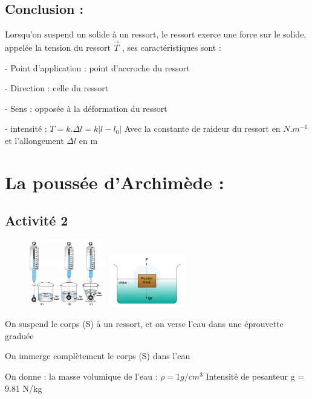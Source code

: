 \documentclass[12pt]{article}
\begin{document}
\subsection{Conclusion : }
Lorsqu’on suspend un solide à un ressort, le ressort exerce une force sur le solide, appelée la tension du ressort $\vec{T}$ ,
ses caractéristiques sont :

  - Point d’application : point d’accroche du ressort

  - Direction : celle du ressort

  - Sens : opposée à la déformation du ressort

  - intensité : $T = k.\Delta{l} = k|l - l_0|$
  Avec la constante de raideur du ressort en $N.m^{-1}$
et l’allongement $\Delta{l}$ en m

\section{La poussée d'Archimède :  }

 
\subsection{Activité 2}

\begin{figure}
\includegraphics[width=0.3\textwidth]{./img/img03.png}
\includegraphics[width=0.3\textwidth]{./img/img04.png}
\end{figure}

On suspend le corps (S) à un ressort, et on verse l’eau dans une
éprouvette graduée

On immerge complètement le corps (S) dans l’eau

On donne : la masse volumique de l’eau : $\rho = 1g/{cm^3}$
Intensité de pesanteur g = 9.81 N/kg
\end{document}
